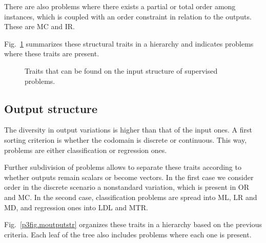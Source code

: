 There are also problems where there exists a partial or total order among instances, which is coupled with an order constraint in relation to the outputs. These are MC and IR.

Fig.~\ref{p3fig.minputstr} summarizes these structural traits in a hierarchy and indicates problems where these traits are present.

\begin{figure}[ht]
\centering\scriptsize
{}
\caption{\label{p3fig.minputstr}Traits that can be found on the input structure of supervised problems.}
\end{figure}

\subsection{Output structure}
\label{p3sec:multioutput}

The diversity in output variations is higher than that of the input ones. A first sorting criterion is whether the codomain is discrete or continuous. This way, problems are either classification or regression ones.

Further subdivision of problems allows to separate these traits according to whether outputs remain scalars or become vectors. In the first case we consider order in the discrete scenario a nonstandard variation, which is present in OR and MC. In the second case, classification problems are spread into ML, LR and MD, and regression ones into LDL and MTR. 

Fig.~\ref{p3fig.moutputstr} organizes these traits in a hierarchy based on the previous criteria. Each leaf of the tree also includes problems where each one is present.

